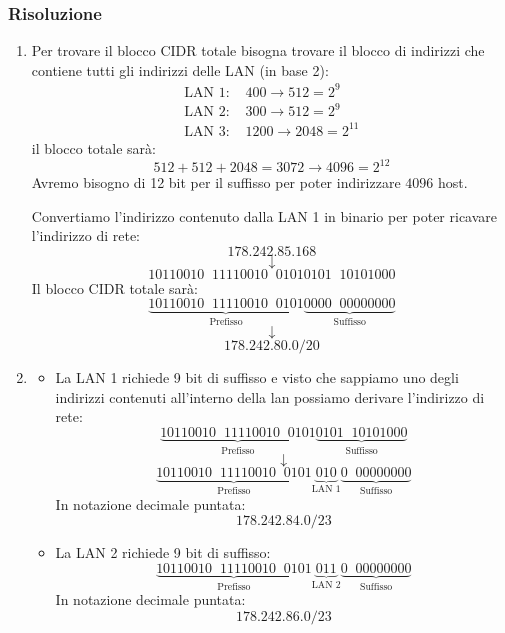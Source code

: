 \documentclass[a4paper]{article}
\begin{document}
\subsubsection{Risoluzione}
\begin{enumerate}
  \item 
    Per trovare il blocco CIDR totale bisogna trovare il blocco di indirizzi che
    contiene tutti gli indirizzi delle LAN (in base 2):
    \[
      \begin{aligned}
        \text{LAN 1: } & 400 \to 512 = 2^9\\
        \text{LAN 2: } & 300 \to 512 = 2^9\\
        \text{LAN 3: } & 1200 \to 2048 = 2^{11}
      \end{aligned}
    \] 
    il blocco totale sarà:
    \[
      512 + 512 + 2048 = 3072 \to 4096 = 2^{12}
    \] 
    Avremo bisogno di 12 bit per il suffisso per poter indirizzare \( 4096 \) host.

    \vspace{1em}
    \noindent
    Convertiamo l'indirizzo contenuto dalla LAN 1 in binario per poter ricavare l'indirizzo
    di rete:
    \[
        178.242.85.168
    \]
    \[
    \downarrow
    \] 
    \[
       10110010 \;\; 11110010 \;\; 01010101 \;\; 10101000
    \] 
    Il blocco CIDR totale sarà:
    \[
      \underbrace{10110010 \;\; 11110010 \;\; 0101}_{\text{Prefisso}}
      \underbrace{0000 \;\; 00000000}_{\text{Suffisso}}
    \]
    \[
    \downarrow
    \] 
    \[
      178.242.80.0/20
    \] 

  \item \begin{itemize}
    \item La LAN 1 richiede 9 bit di suffisso e visto che sappiamo uno degli indirizzi
      contenuti all'interno della lan possiamo derivare l'indirizzo di rete:
      \[
        \underbrace{10110010 \;\; 11110010 \;\; 0101}_{\text{Prefisso}}
        \underbrace{0101 \;\; 10101000}_{\text{Suffisso}}
      \]
      \[
      \downarrow
      \] 
      \[
        \underbrace{10110010 \;\; 11110010 \;\; 0101}_{\text{Prefisso}}
        \underbrace{010}_{\text{LAN 1}}
        \underbrace{0 \;\; 00000000}_{\text{Suffisso}}
      \]
      In notazione decimale puntata:
      \[
      178.242.84.0/23
      \] 

    \item La LAN 2 richiede 9 bit di suffisso:
      \[
        \underbrace{10110010 \;\; 11110010 \;\; 0101}_{\text{Prefisso}}
        \underbrace{011}_{\text{LAN 2}}
        \underbrace{0 \;\; 00000000}_{\text{Suffisso}}
      \]
      In notazione decimale puntata:
      \[
      178.242.86.0/23
      \] 


\end{itemize}
\end{enumerate}
\end{document}

